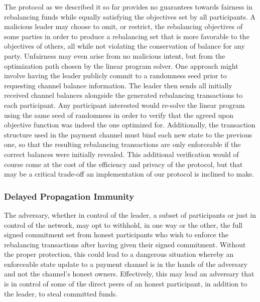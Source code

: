 \documentclass[sigconf]{acmart}
\begin{document}
The protocol as we described it so far provides no guarantees towards fairness in rebalancing funds while equally satisfying the objectives set by all participants. A malicious leader may choose to omit, or restrict, the rebalancing objectives of some parties in order to produce a rebalancing set that is more favorable to the objectives of others, all while not violating the conservation of balance for any party. Unfairness may even arise from no malicious intent, but from the optimization path chosen by the linear program solver.
One approach might involve having the leader publicly commit to a randomness seed prior to requesting channel balance information. The leader then sends all initially received channel balances alongside the generated rebalancing transactions to each participant. Any participant interested would re-solve the linear program using the same seed of randomness in order to verify that the agreed upon objective function was indeed the one optimized for. Additionally, the transaction structure used in the payment channel must bind each new state to the previous one, so that the resulting rebalancing transactions are only enforceable if the correct balances were initially revealed.
This additional verification would of course come at the cost of the efficiency and privacy of the protocol, but that may be a critical trade-off an implementation of our protocol is inclined to make.

\subsubsection{Delayed Propagation Immunity}
\label{sec:analysis:dispute}
The adversary, whether in control of the leader, a subset of participants or just in control of the network, may opt to withhold, in one way or the other, the full signed commitment set from honest participants who wish to enforce the rebalancing transactions after having given their signed commitment.
Without the proper protection, this could lead to a dangerous situation whereby an enforceable state update to a payment channel is in the hands of the adversary and not the channel's honest owners. Effectively, this may lead an adversary that is in control of some of the direct peers of an honest participant, in addition to the leader, to steal committed funds.
\end{document}
